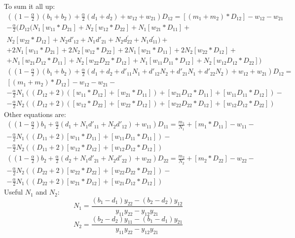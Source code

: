 To sum it all up:
\begin{align*}
((1-\frac{\alpha}{2})(b_{1}+b_{2})+\frac{\alpha}{2}(d_{1}+d_{2})+w_{12}+w_{21})D_{12}=[(m_{1}+m_{2})*D_{12}]-w_{12}-w_{21}		\\
-\frac{\alpha}{2}(D_{12}(N_{1}[w_{11}*D_{21}]+N_{2}[w_{12}*D_{22}]+N_{1}[w_{21}*D_{11}]+		\\
N_{2}[w_{22}*D_{12}]+N_{2}d'_{12}+N_{1}d'_{21}+N_{2}d_{22}^{'}+N_{1}d{}_{11}^{'})+		\\
+2N_{1}[w_{11}*D_{21}]+2N_{2}[w_{12}*D_{22}]+2N_{1}[w_{21}*D_{11}]+2N_{2}[w_{22}*D_{12}]+	\\	
+N_{1}[w_{21}D_{12}*D_{11}]+N_{2}[w_{22}D_{22}*D_{12}]+N_{1}[w_{11}D_{11}*D_{12}]+N_{2}[w_{12}D_{12}*D_{22}])		
\end{align*}
\begin{align*}
((1-\frac{\alpha}{2})(b_{1}+b_{2})+\frac{\alpha}{2}(d_{1}+d_{2}+d'_{11}N_{1}+d'_{12}N_{2}+d'_{21}N_{1}+d'_{22}N_{2})+w_{12}+w_{21})D_{12}=	\\
[(m_{1}+m_{2})*D_{12}]-w_{12}-w_{21}-\\
-\frac{\alpha}{2}N_{1}((D_{12}+2)([w_{11}*D_{12}]+[w_{21}*D_{11}])+[w_{21}D_{12}*D_{11}]+[w_{11}D_{11}*D_{12}])-\\		
-\frac{\alpha}{2}N_{2}((D_{12}+2)([w_{12}*D_{22}]+[w_{22}*D_{12}])+[w_{22}D_{22}*D_{12}]+[w_{12}D_{12}*D_{22}])		
\end{align*}
Other equations are:
\begin{align*}
((1-\frac{\alpha}{2})b_{1}+\frac{\alpha}{2}(d_{1}+N_{1}d'_{11}+N_{2}d'_{12})+w_{11})D_{11}=\frac{m_{1}}{N_{1}}+\left[m_{1}*D_{11}\right]-w_{11}-\\
-\frac{\alpha}{2}N_{1}((D_{11}+2)[w_{11}*D_{11}]+[w_{11}D_{11}*D_{11}])-\\
-\frac{\alpha}{2}N_{2}((D_{11}+2)[w_{12}*D_{12}]+[w_{12}D_{12}*D_{12}])
\end{align*}
\begin{align*}
((1-\frac{\alpha}{2})b_{2}+\frac{\alpha}{2}(d_{2}+N_{1}d'_{21}+N_{2}d'_{22})+w_{22})D_{22}=\frac{m_{2}}{N_{2}}+\left[m_{2}*D_{22}\right]-w_{22}-\\
-\frac{\alpha}{2}N_{2}((D_{22}+2)[w_{22}*D_{22}]+[w_{22}D_{22}*D_{22}])-\\
-\frac{\alpha}{2}N_{1}((D_{22}+2)[w_{21}*D_{12}]+[w_{21}D_{12}*D_{12}])
\end{align*}
Useful $ N_{1} $ and $ N_{2} $:
\begin{equation*}
N_{1}=\frac{(b_{1}-d_{1})y_{22}-(b_{2}-d_{2})y_{12}}{y_{11}y_{22}-y_{12}y_{21}}
\end{equation*}
\begin{equation*}
N_{2}=\frac{(b_{2}-d_{2})y_{11}-(b_{1}-d_{1})y_{21}}{y_{11}y_{22}-y_{12}y_{21}}
\end{equation*}